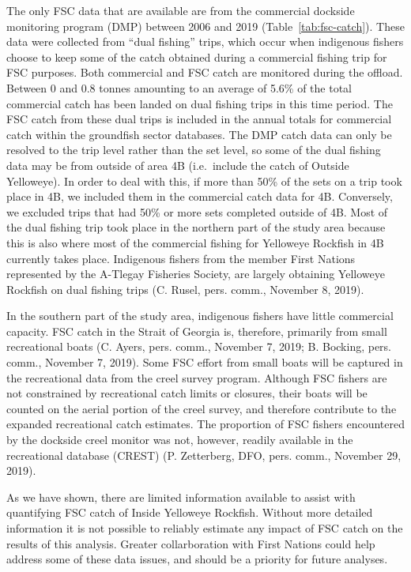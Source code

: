 \documentclass[11pt]{book}
\begin{document}
The only FSC data that are available are from the commercial dockside monitoring program (DMP) between 2006 and 2019 (Table~\ref{tab:fsc-catch}). These data were collected from ``dual fishing'' trips, which occur when indigenous fishers choose to keep some of the catch obtained during a commercial fishing trip for FSC purposes. Both commercial and FSC catch are monitored during the offload. Between 0 and 0.8 tonnes amounting to an average of 5.6\% of the total commercial catch has been landed on dual fishing trips in this time period. The FSC catch from these dual trips is included in the annual totals for commercial catch within the groundfish sector databases. The DMP catch data can only be resolved to the trip level rather than the set level, so some of the dual fishing data may be from outside of area 4B (i.e.~include the catch of Outside Yelloweye). In order to deal with this, if more than 50\% of the sets on a trip took place in 4B, we included them in the commercial catch data for 4B. Conversely, we excluded trips that had 50\% or more sets completed outside of 4B. Most of the dual fishing trip took place in the northern part of the study area because this is also where most of the commercial fishing for Yelloweye Rockfish in 4B currently takes place. Indigenous fishers from the member First Nations represented by the A-Tlegay Fisheries Society, are largely obtaining Yelloweye Rockfish on dual fishing trips (C. Rusel, pers. comm., November 8, 2019).

In the southern part of the study area, indigenous fishers have little commercial capacity. FSC catch in the Strait of Georgia is, therefore, primarily from small recreational boats (C. Ayers, pers. comm., November 7, 2019; B. Bocking, pers. comm., November 7, 2019). Some FSC effort from small boats will be captured in the recreational data from the creel survey program. Although FSC fishers are not constrained by recreational catch limits or closures, their boats will be counted on the aerial portion of the creel survey, and therefore contribute to the expanded recreational catch estimates. The proportion of FSC fishers encountered by the dockside creel monitor was not, however, readily available in the recreational database (CREST) (P. Zetterberg, DFO, pers. comm., November 29, 2019).

As we have shown, there are limited information available to assist with quantifying FSC catch of Inside Yelloweye Rockfish. Without more detailed information it is not possible to reliably estimate any impact of FSC catch on the results of this analysis. Greater collarboration with First Nations could help address some of these data issues, and should be a priority for future analyses.
\end{document}
